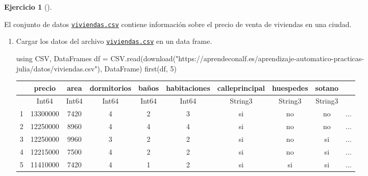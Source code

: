 \documentclass[
  a4paper,
]{scrreport}
\newenvironment{Shaded}{\begin{snugshade}}{\end{snugshade}}
\newcommand{\BuiltInTok}[1]{\textcolor[rgb]{0.00,0.23,0.31}{#1}}
\newcommand{\FloatTok}[1]{\textcolor[rgb]{0.68,0.00,0.00}{#1}}
\newcommand{\FunctionTok}[1]{\textcolor[rgb]{0.28,0.35,0.67}{#1}}
\newcommand{\ImportTok}[1]{\textcolor[rgb]{0.00,0.46,0.62}{#1}}
\newcommand{\NormalTok}[1]{\textcolor[rgb]{0.00,0.23,0.31}{#1}}
\newcommand{\OperatorTok}[1]{\textcolor[rgb]{0.37,0.37,0.37}{#1}}
\newcommand{\StringTok}[1]{\textcolor[rgb]{0.13,0.47,0.30}{#1}}
\theoremstyle{definition}
\newtheorem{exercise}{Ejercicio}[chapter]
\theoremstyle{remark}
\begin{document}
\begin{exercise}[]\protect\hypertarget{exr-regresion-1}{}\label{exr-regresion-1}

El conjunto de datos
\href{./datos/viviendas.csv}{\texttt{viviendas.csv}} contiene
información sobre el precio de venta de viviendas en una ciudad.

\begin{enumerate}
\def\labelenumi{\alph{enumi}.}
\item
  Cargar los datos del archivo
  \href{https://aprendeconalf.es/aprendizaje-automatico-practicas-julia/datos/viviendas.csv}{\texttt{viviendas.csv}}
  en un data frame.

  \begin{tcolorbox}[enhanced jigsaw, left=2mm, colback=white, coltitle=black, opacitybacktitle=0.6, titlerule=0mm, breakable, bottomrule=.15mm, toptitle=1mm, bottomtitle=1mm, colbacktitle=quarto-callout-tip-color!10!white, opacityback=0, rightrule=.15mm, title=\textcolor{quarto-callout-tip-color}{\faLightbulb}\hspace{0.5em}{Solución}, colframe=quarto-callout-tip-color-frame, arc=.35mm, leftrule=.75mm, toprule=.15mm]

\begin{Shaded}
\begin{Highlighting}[]
\ImportTok{using} \BuiltInTok{CSV}\NormalTok{, }\BuiltInTok{DataFrames}
\NormalTok{df }\OperatorTok{=}\NormalTok{ CSV.}\FunctionTok{read}\NormalTok{(}\FunctionTok{download}\NormalTok{(}\StringTok{"https://aprendeconalf.es/aprendizaje{-}automatico{-}practicas{-}julia/datos/viviendas.csv"}\NormalTok{), DataFrame)}
\FunctionTok{first}\NormalTok{(df, }\FloatTok{5}\NormalTok{)}
\end{Highlighting}
\end{Shaded}

  \begin{tabular}{r|ccccccccc}
      & precio & area & dormitorios & baños & habitaciones & calleprincipal & huespedes & sotano & \\
      \hline
      & Int64 & Int64 & Int64 & Int64 & Int64 & String3 & String3 & String3 & \\
      \hline
      1 & 13300000 & 7420 & 4 & 2 & 3 & si & no & no & $\dots$ \\
      2 & 12250000 & 8960 & 4 & 4 & 4 & si & no & no & $\dots$ \\
      3 & 12250000 & 9960 & 3 & 2 & 2 & si & no & si & $\dots$ \\
      4 & 12215000 & 7500 & 4 & 2 & 2 & si & no & si & $\dots$ \\
      5 & 11410000 & 7420 & 4 & 1 & 2 & si & si & si & $\dots$ \\
  \end{tabular}


\end{tcolorbox}
\end{enumerate}
\end{exercise}
\end{document}
